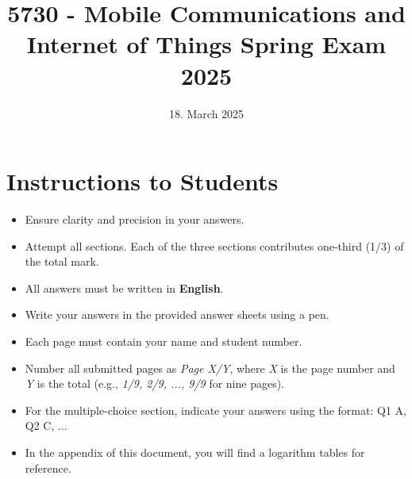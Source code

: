 \documentclass[12pt]{article}
\title{5730 - Mobile Communications and Internet of Things Spring Exam 2025}
\date{18. March 2025}
\begin{document}
\pagestyle{fancy}
\fancyhf{}  %
\renewcommand{\headrulewidth}{0pt}  %
\renewcommand{\footrulewidth}{0pt}  %
\fancyfoot[R]{\thepage/\pageref{LastPage}}  %
\fancypagestyle{plain}{
    \fancyhf{}  %
    \fancyfoot[R]{\thepage/\pageref{LastPage}}  %
    \renewcommand{\headrulewidth}{0pt}  %
    \renewcommand{\footrulewidth}{0pt}  %
}
\maketitle

\section*{Instructions to Students}

\begin{itemize}
    \item Ensure clarity and precision in your answers.
    \item Attempt all sections. Each of the three sections contributes one-third (1/3) of the total mark.
    \item All answers must be written in \textbf{English}.
    \item Write your answers in the provided answer sheets using a pen.
    \item Each page must contain your name and student number.
    \item Number all submitted pages as \textit{Page X/Y}, where \textit{X} is the page number and \textit{Y} is the total (e.g., \textit{1/9, 2/9, ..., 9/9} for nine pages). 
    \item For the multiple-choice section, indicate your answers using the format: Q1 A, Q2 C, ...
    \item In the appendix of this document, you will find a logarithm tables for reference.
\end{itemize}


\end{document}
